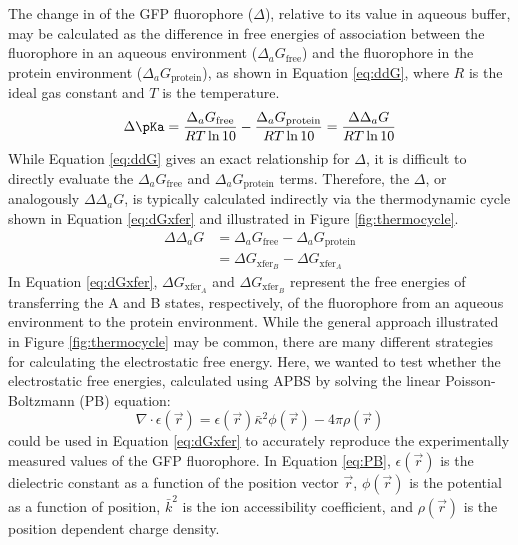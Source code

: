 The change in \pKa{} of the GFP fluorophore ($\Delta$\pKa{}), relative to its value in aqueous buffer, may be calculated as the difference in free energies of association between the fluorophore in an aqueous environment ($\Delta_aG_\text{free}$) and the fluorophore in the protein environment ($\Delta_aG_\text{protein}$), as shown in Equation \ref{eq:ddG}, where $R$ is the ideal gas constant and $T$ is the temperature.
\begin{equation}
    \Delta \pKa = \frac{\Delta_aG_\text{free}}{RT \ln 10} - \frac{\Delta_aG_\text{protein}}{RT \ln 10} = \frac{\Delta\Delta_aG}{RT \ln 10}
    \label{eq:ddG}
\end{equation}
While Equation \ref{eq:ddG} gives an exact relationship for $\Delta$\pKa{}, it is difficult to directly evaluate the $\Delta_aG_\text{free}$ and $\Delta_aG_\text{protein}$ terms.
Therefore, the $\Delta$\pKa{}, or analogously $\Delta\Delta_aG$, is typically calculated indirectly via the thermodynamic cycle shown in Equation \ref{eq:dGxfer} and illustrated in Figure \ref{fig:thermocycle}.
\begin{equation}
    \begin{split}
    \Delta\Delta_a G &= \Delta_a G_{\text{free}} - \Delta_a G_{\text{protein}} \\
    &= \Delta G_{\text{xfer}_B} - \Delta G_{\text{xfer}_A}
    \end{split}
    \label{eq:dGxfer}
\end{equation}
In Equation \ref{eq:dGxfer}, $\Delta G_{\text{xfer}_A}$ and $\Delta G_{\text{xfer}_B}$ represent the free energies of transferring the A and B states, respectively, of the fluorophore from an aqueous environment to the protein environment.
While the general approach illustrated in Figure \ref{fig:thermocycle} may be common, there are many different strategies for calculating the electrostatic free energy.
Here, we wanted to test whether the electrostatic free energies, calculated using APBS by solving the linear Poisson-Boltzmann (PB) equation:
\begin{equation}
    \nabla \cdot \epsilon(\vec{r}) = \epsilon(\vec{r})\bar{\kappa}^2\phi(\vec{r}) - 4\pi\rho(\vec{r})
    \label{eq:PB}
\end{equation}
could be used in Equation \ref{eq:dGxfer} to accurately reproduce the experimentally measured \pKa{} values of the GFP fluorophore. 
In Equation \ref{eq:PB}, $\epsilon(\vec{r})$ is the dielectric constant as a function of the position vector $\vec{r}$, $\phi(\vec{r})$ is the potential as a function of position, $\bar{k}^2$  is the ion accessibility coefficient, and $\rho(\vec{r})$ is the position dependent charge density. 

